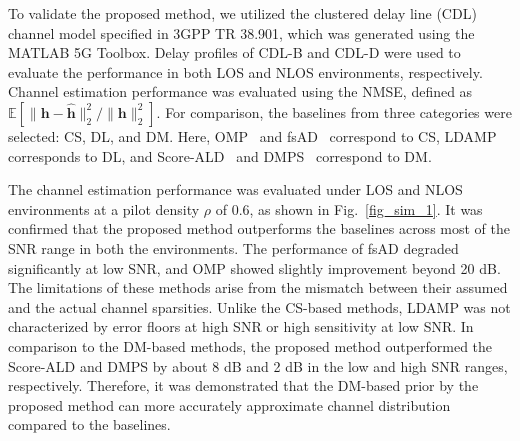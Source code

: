 \documentclass[lettersize,journal]{IEEEtran}
\newcommand{\tred}{\textcolor{red}}
\begin{document}
To validate the proposed method, we utilized the clustered delay line (CDL)
channel model specified in 3GPP TR 38.901, which was generated using the MATLAB 5G Toolbox. Delay profiles of CDL-B and CDL-D were used to evaluate the performance in both LOS and NLOS environments, respectively. Channel estimation performance was evaluated using the NMSE, defined as $\mathbb{E}[\|\mathbf{h}-\hat{\mathbf{h}}\|_{2}^{2} / \|\mathbf{h}\|_{2}^{2}]$. For comparison, the baselines from three categories were selected: CS, DL, and DM. Here, OMP~\cite{zhangAtomicNormDenoisingBased2018} and  fsAD~\cite{mendez-rialHybridMIMOArchitectures2016} correspond to CS, LDAMP~\cite{heDeepLearningBasedChannel2018} corresponds to DL, and Score-ALD~\cite{arvinteMIMOChannelEstimation2023} and DMPS~\cite{zhouGenerativeDiffusionModels2025} correspond to DM.


The channel estimation performance was evaluated under LOS and NLOS environments at a pilot density $\rho$ of 0.6, as shown in Fig.~\ref{fig_sim_1}. It was confirmed that the proposed method outperforms the baselines across most of the SNR range in both the environments. The performance of fsAD degraded significantly at low SNR, and OMP showed slightly improvement beyond 20 dB. The limitations of these methods arise from the mismatch between their assumed and the actual channel sparsities. Unlike the CS-based methods, LDAMP was not characterized by error floors at high SNR or high sensitivity at low SNR. In comparison to the DM-based methods, the proposed method outperformed the Score-ALD and DMPS by about 8 dB and 2 dB in the low and high SNR ranges, respectively. Therefore, it was demonstrated that the DM-based prior by the proposed method can more accurately approximate channel distribution compared to the baselines.
\end{document}
